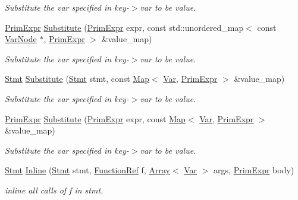 \begin{DoxyCompactItemize}
\begin{DoxyCompactList}\small\item\em Substitute the var specified in key-\/$>$var to be value. \end{DoxyCompactList}\item 
\hyperlink{classtvm_1_1PrimExpr}{Prim\+Expr} \hyperlink{namespacetvm_1_1tir_a1753495736a7c0ab703ed01c673ec5d0}{Substitute} (\hyperlink{classtvm_1_1PrimExpr}{Prim\+Expr} expr, const std\+::unordered\+\_\+map$<$ const \hyperlink{classtvm_1_1tir_1_1VarNode}{Var\+Node} $\ast$, \hyperlink{classtvm_1_1PrimExpr}{Prim\+Expr} $>$ \&value\+\_\+map)
\begin{DoxyCompactList}\small\item\em Substitute the var specified in key-\/$>$var to be value. \end{DoxyCompactList}\item 
\hyperlink{classtvm_1_1tir_1_1Stmt}{Stmt} \hyperlink{namespacetvm_1_1tir_abc79c4131e8b95c4ae4be56d4ab3c494}{Substitute} (\hyperlink{classtvm_1_1tir_1_1Stmt}{Stmt} stmt, const \hyperlink{classtvm_1_1Map}{Map}$<$ \hyperlink{classtvm_1_1tir_1_1Var}{Var}, \hyperlink{classtvm_1_1PrimExpr}{Prim\+Expr} $>$ \&value\+\_\+map)
\begin{DoxyCompactList}\small\item\em Substitute the var specified in key-\/$>$var to be value. \end{DoxyCompactList}\item 
\hyperlink{classtvm_1_1PrimExpr}{Prim\+Expr} \hyperlink{namespacetvm_1_1tir_a34e6a1e27339fcc255f664dd14e7c6cc}{Substitute} (\hyperlink{classtvm_1_1PrimExpr}{Prim\+Expr} expr, const \hyperlink{classtvm_1_1Map}{Map}$<$ \hyperlink{classtvm_1_1tir_1_1Var}{Var}, \hyperlink{classtvm_1_1PrimExpr}{Prim\+Expr} $>$ \&value\+\_\+map)
\begin{DoxyCompactList}\small\item\em Substitute the var specified in key-\/$>$var to be value. \end{DoxyCompactList}\item 
\hyperlink{classtvm_1_1tir_1_1Stmt}{Stmt} \hyperlink{namespacetvm_1_1tir_a96379de32bcde10449bdb01b9b816e99}{Inline} (\hyperlink{classtvm_1_1tir_1_1Stmt}{Stmt} stmt, \hyperlink{classtvm_1_1tir_1_1FunctionRef}{Function\+Ref} f, \hyperlink{classtvm_1_1Array}{Array}$<$ \hyperlink{classtvm_1_1tir_1_1Var}{Var} $>$ args, \hyperlink{classtvm_1_1PrimExpr}{Prim\+Expr} body)
\begin{DoxyCompactList}\small\item\em inline all calls of f in stmt. \end{DoxyCompactList}\item 

\end{DoxyCompactItemize}
